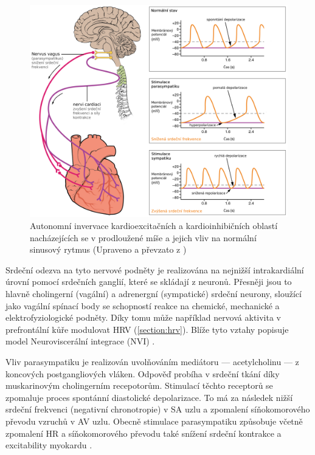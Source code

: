 \begin{figure}[h]
	\begin{center}
		\includegraphics[width=1\textwidth]{../assets/anatomy/hr_regulation}
		\caption{Autonomní invervace kardioexcitačních a kardioinhibičních
			oblastí nacházejících se v prodloužené míše a jejich vliv na
			normální sinusový rytmus (Upraveno a převzato z \cite{OpenStax})}
		\label{fig:hr_regulation}
	\end{center}
\end{figure}

Srdeční odezva na tyto nervové podněty je realizována na nejnižší intrakardiální
úrovní pomocí srdečních ganglií, které se skládají z neuronů. Přesněji jsou to
hlavně cholingerní (vagální) a adrenergní (sympatické) srdeční neurony, sloužící
jako vagální spínací body se schopností reakce na chemické, mechanické a
elektrofyziologické podněty. Díky tomu může například nervová aktivita v
prefrontální kůře modulovat HRV (\ref{section:hrv}). Blíže tyto vztahy popisuje
model Neuroviscerální integrace (NVI) \cite{Smith2017}.

Vliv parasympatiku je realizován uvolňováním mediátoru --- acetylcholinu --- z
koncových postgangliových vláken. Odpověď probíha v srdeční tkání díky
muskarinovým cholingerním recepotorům. Stimulací těchto receptorů se zpomaluje
proces spontánní diastolické depolarizace. To má za následek nižší srdeční
frekvenci (negativní chronotropie) v SA uzlu a zpomalení síňokomorového převodu
vzruchů v AV uzlu. Obecně stimulace parasympatiku způsobuje včetně zpomalení HR
a síňokomorového převodu také snížení srdeční kontrakce a excitability myokardu
\cite{Kittnar2020}.

